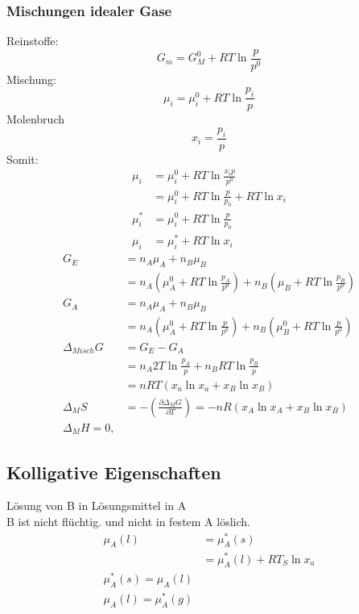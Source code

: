 \documentclass[a4paper, fleqn]{article}
\begin{document}
\subsubsection{Mischungen idealer Gase}
Reinstoffe:
\begin{equation*}
    G_m = G_M^0 + RT \ln \frac{p}{p^0}
\end{equation*}
Mischung:
\begin{equation*}
    \mu_i = \mu_i^0 + RT\ln\frac{p_i}{p}
\end{equation*}
Molenbruch\
\begin{equation*}
    x_i = \frac{p_i}{p}
\end{equation*}
Somit:
\begin{align*}
    \mu_i &= \mu_i^0 + RT \ln \frac{x_ip}{p^0}\\
    &= \mu_i^0 + RT \ln\frac{p}{p_0} + RT\ln x_i\\
    \mu_i^* &= \mu_i^0 + RT \ln\frac{p}{p_0}\\
    \mu_i &= \mu_i^* +RT\ln x_i
\end{align*}
\begin{align*}
    G_E &= n_A \mu_A + n_B \mu_B\\
    &= n_A(\mu_A^0+RT\ln \frac{p_A}{p^0}) + n_B (\mu_B + RT \ln \frac{p_B}{p^0})\\
    G_A &= n_A\mu_A + n_B\mu_B\\
    &= n_A(\mu_A^0 + RT\ln\frac{p}{p^0})+n_B(\mu_B^0 + RT \ln\frac{p}{p^0})\\
    \Delta_{Misch} G &= G_E - G_A\\
    &= n_A 2T\ln\frac{p_A}{p}+n_BRT\ln\frac{p_B}{p}\\
    &= nRT(x_a\ln x_a + x_B \ln x_B)\\
    \Delta_M S &= -\left(\frac{\partial \Delta_M G}{\partial T}\right) = -n R (x_A \ln x_A + x_B \ln x_B)\\
    \Delta_M H = 0,
\end{align*}
\subsection{Kolligative Eigenschaften}
Lösung von B in Lösungsmittel in A\\
B ist nicht flüchtig. und nicht in festem A löslich.
\begin{align*}
    \mu_A(l) &= \mu_A^*(s)\\ 
    &= \mu_A^*(l)+RT_S\ln x_a\\
    \mu_A^*(s) = \mu_A(l)\\
    \mu_A(l) = \mu_A^*(g)
\end{align*}
\end{document}
